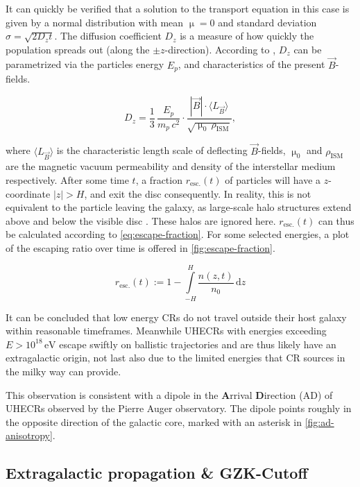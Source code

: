 It can quickly be verified that a solution to the transport equation in this case is given by a normal distribution with mean $\upmu = 0$ and standard deviation 
$\sigma = \sqrt{2D_zt}$. The diffusion coefficient $D_z$ is a measure of how quickly the population spreads out (along the $\pm z$-direction). According to 
\cite{skilling1970diffusion}, $D_z$ can be parametrized via the particles energy $E_p$, and characteristics of the present $\vec{B}$-fields.

\begin{equation}
	\label{eq:diffusion-coefficient}
	D_z =\frac{1}{3}\,\frac{E_p}{m_p\,c^2}\cdot\frac{|\vec{B}|\cdot\langle L_{\vec{B}}\rangle}{\sqrt{\upmu_0\,\rho_\text{ISM}}},
\end{equation}

where $\langle L_{\vec{B}} \rangle$ is the characteristic length scale of deflecting $\vec{B}$-fields, $\upmu_0$ and $\rho_\text{ISM}$ are the magnetic vacuum 
permeability and density of the interstellar medium respectively. After some time $t$, a fraction $r_\text{esc.}(t)$ of particles will have a $z$-coordinate 
$|z| > H$, and exit the disc consequently. In reality, this is not equivalent to the particle leaving the galaxy, as large-scale halo structures extend above and 
below the visible disc \cite{searle1978compositions}. These halos are ignored here. $r_\text{esc.}(t)$ can thus be calculated according to 
\autoref{eq:escape-fraction}. For some selected energies, a plot of the escaping ratio over time is offered in \autoref{fig:escape-fraction}.

\begin{equation}
\label{eq:escape-fraction}
r_\text{esc.}(t) := 1 - \int\limits_{-H}^{H} \frac{n(z,t)}{n_0}\,\text{d}z
\end{equation}


It can be concluded that low energy CRs do not travel outside their host galaxy within reasonable timeframes. Meanwhile UHECRs with energies exceeding 
$E>10^{18}\,\text{eV}$ escape swiftly on ballistic trajectories and are thus likely have an extragalactic origin, not last also due to the limited energies that CR
sources in the milky way can provide.

This observation is consistent with a dipole in the \textbf{A}rrival \textbf{D}irection (AD) of UHECRs observed by the Pierre Auger observatory. The dipole points
roughly in the opposite direction of the galactic core, marked with an asterisk in \autoref{fig:ad-anisotropy}.

\subsection{Extragalactic propagation \& GZK-Cutoff}
\label{ssec:gzk-cutoff}

